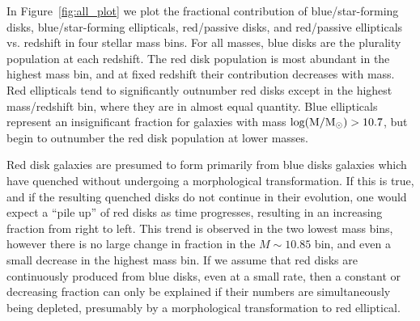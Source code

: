 \documentclass[useAMS,usenatbib]{mn2e}
\begin{document}
In Figure~\ref{fig:all_plot} we plot the fractional contribution of blue/star-forming disks, blue/star-forming ellipticals, red/passive disks, and red/passive ellipticals vs. redshift in four stellar mass bins. For all masses, blue disks are the plurality population at each redshift. The red disk population is most abundant in the highest mass bin, and at fixed redshift their contribution decreases with mass. Red ellipticals tend to significantly outnumber red disks except in the highest mass/redshift bin, where they are in almost equal quantity. Blue ellipticals represent an insignificant fraction for galaxies with mass $\rm log(M/M_{\odot})>10.7$, but begin to outnumber the red disk population at lower masses. 


Red disk galaxies are presumed to form primarily from blue disks galaxies which have quenched without undergoing a morphological transformation. If this is true, and if the resulting quenched disks do not continue in their evolution, one would expect a ``pile up'' of red disks as time progresses, resulting in an increasing fraction from right to left. This trend is observed in the two lowest mass bins, however there is no large change in fraction in the $M\sim10.85$ bin, and even a small decrease in the highest mass bin. If we assume that red disks are continuously produced from blue disks, even at a small rate, then a constant or decreasing fraction can only be explained if their numbers are simultaneously being depleted, presumably by a morphological transformation to red elliptical.
\end{document}
